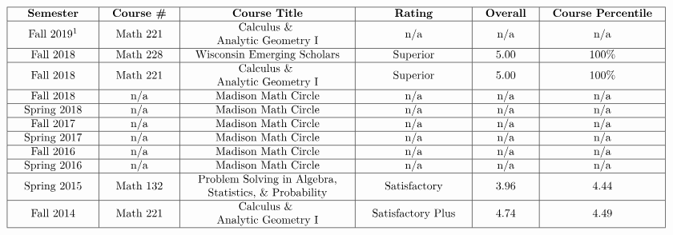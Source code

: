 \documentclass[letterpaper,11pt]{article}
\begin{document}
\[
\begin{tabular}{| c | c | c | c | c | c |}
\hline
\textbf{Semester} & \textbf{Course \#} & \textbf{Course Title} & \textbf{Rating} & \;\;\textbf{Overall}\;\; & \;\;\textbf{Course Percentile}\;\;\\ \hline
Fall 2019\footnote{Course currently ongoing.} & \;\; Math 221 \;\; & $\begin{matrix}
\text{Calculus \& }\\
\text{Analytic Geometry I}
\end{matrix}$ & \;\; n/a \;\;& n/a & n/a \\ \hline

Fall 2018 & \;\; Math 228 \;\; & $\begin{matrix}
\text{Wisconsin Emerging Scholars}
\end{matrix}$ & \;\; Superior \;\;& 5.00 & 100\% \\ \hline

Fall 2018 & \;\; Math 221 \;\; & $\begin{matrix}
\text{Calculus \& }\\
\text{Analytic Geometry I}
\end{matrix}$ & \;\; Superior \;\;& 5.00 & 100\% \\ \hline

Fall 2018 & n/a & Madison Math Circle & n/a & n/a & n/a \\ \hline

Spring 2018 & n/a & Madison Math Circle & n/a & n/a & n/a \\ \hline

Fall 2017 & n/a & Madison Math Circle & n/a & n/a & n/a \\ \hline
\;\; Spring 2017 \;\; & n/a & Madison Math Circle & n/a & n/a & n/a\\ \hline
Fall 2016 & n/a & Madison Math Circle & n/a & n/a & n/a \\ \hline
\;\;  Spring 2016 \;\;  & n/a & Madison Math Circle & n/a & n/a & n/a \\ \hline
\;\;  Spring 2015 \;\; & \;\; Math 132 \;\; & $\quad\begin{matrix}
\text{Problem Solving in Algebra,}\\
\text{Statistics, \& Probability}\end{matrix}\quad$  & Satisfactory & 3.96 & 4.44\\ \hline
Fall 2014 & \;\; Math 221 \;\; & $\begin{matrix}
\text{Calculus \& }\\
\text{Analytic Geometry I}
\end{matrix}$ & \;\; Satisfactory Plus \;\;& 4.74 & 4.49 \\ \hline
\end{tabular}
\]
\end{document}
